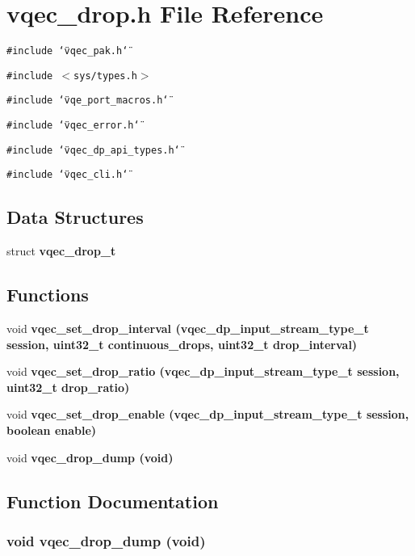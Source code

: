 \section{vqec\_\-drop.h File Reference}
\label{vqec__drop_8h}
{\tt \#include \char`\"{}vqec\_\-pak.h\char`\"{}}\par
{\tt \#include $<$sys/types.h$>$}\par
{\tt \#include \char`\"{}vqe\_\-port\_\-macros.h\char`\"{}}\par
{\tt \#include \char`\"{}vqec\_\-error.h\char`\"{}}\par
{\tt \#include \char`\"{}vqec\_\-dp\_\-api\_\-types.h\char`\"{}}\par
{\tt \#include \char`\"{}vqec\_\-cli.h\char`\"{}}\par
\subsection*{Data Structures}
\begin{CompactItemize}
\item 
struct \bf{vqec\_\-drop\_\-t}
\end{CompactItemize}
\subsection*{Functions}
\begin{CompactItemize}
\item 
void \bf{vqec\_\-set\_\-drop\_\-interval} (vqec\_\-dp\_\-input\_\-stream\_\-type\_\-t session, uint32\_\-t continuous\_\-drops, uint32\_\-t drop\_\-interval)
\item 
void \bf{vqec\_\-set\_\-drop\_\-ratio} (vqec\_\-dp\_\-input\_\-stream\_\-type\_\-t session, uint32\_\-t drop\_\-ratio)
\item 
void \bf{vqec\_\-set\_\-drop\_\-enable} (vqec\_\-dp\_\-input\_\-stream\_\-type\_\-t session, boolean enable)
\item 
void \bf{vqec\_\-drop\_\-dump} (void)
\end{CompactItemize}


\subsection{Function Documentation}
\subsubsection{\setlength{\rightskip}{0pt plus 5cm}void vqec\_\-drop\_\-dump (void)}\label{vqec__drop_8h_718b1f91793ce1f3a4bd10fdc0bc08b5}


